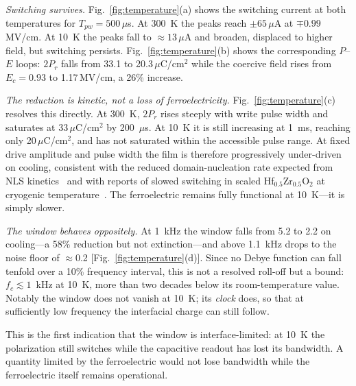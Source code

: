 \documentclass[journal]{IEEEtran}
\newcommand{\hzo}{Hf$_{0.5}$Zr$_{0.5}$O$_{2}$}
\newcommand{\fc}{f_{c}}
\newcommand{\uCcm}{\,$\mu$C/cm$^{2}$}
\newcommand{\MVcm}{\,MV/cm}
\begin{document}
\textit{Switching survives.} Fig.~\ref{fig:temperature}(a) shows the
switching current at both temperatures for $T_{pw} = 500\,\mu$s. At 300~K the
peaks reach $\pm65\,\mu$A at $\mp0.99$\MVcm{}. At 10~K the peaks fall to
$\approx13\,\mu$A and broaden, displaced to higher field, but switching
persists. Fig.~\ref{fig:temperature}(b) shows the corresponding $P$--$E$
loops: $2P_r$ falls from 33.1 to 20.3\uCcm{} while the coercive field rises
from $E_c = 0.93$ to 1.17\MVcm{}, a 26\% increase.

\textit{The reduction is kinetic, not a loss of ferroelectricity.}
Fig.~\ref{fig:temperature}(c) resolves this directly. At 300~K, $2P_r$ rises
steeply with write pulse width and saturates at 33\uCcm{} by 200~$\mu$s. At
10~K it is still increasing at 1~ms, reaching only 20\uCcm{}, and has not
saturated within the accessible pulse range. At fixed drive amplitude and
pulse width the film is therefore progressively under-driven on cooling,
consistent with the reduced domain-nucleation rate expected from NLS
kinetics~\cite{tagantsev2002} and with reports of slowed switching in scaled
\hzo{} at cryogenic temperature~\cite{das2026cryo}. The ferroelectric remains
fully functional at 10~K---it is simply slower.

\textit{The window behaves oppositely.} At 1~kHz the window falls from 5.2 to
2.2 on cooling---a 58\% reduction but not extinction---and above 1.1~kHz
drops to the noise floor of $\approx$0.2 [Fig.~\ref{fig:temperature}(d)].
Since no Debye function can fall tenfold over a 10\% frequency interval, this
is not a resolved roll-off but a bound: $\fc \lesssim 1$~kHz at 10~K, more
than two decades below its room-temperature value. Notably the window does
not vanish at 10~K; its \emph{clock} does, so that at sufficiently low
frequency the interfacial charge can still follow.

This is the first indication that the window is interface-limited: at 10~K
the polarization still switches while the capacitive readout has lost its
bandwidth. A quantity limited by the ferroelectric would not lose bandwidth
while the ferroelectric itself remains operational.
\end{document}
